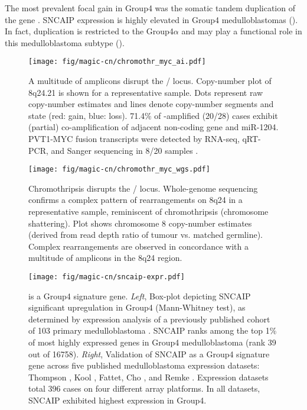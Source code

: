 The most prevalent focal gain in Group4 was the somatic tandem duplication of the  gene . SNCAIP expression is highly elevated in Group4 medulloblastomas (). In fact,  duplication is restricted to the Group4$\alpha$ and may play a functional role in this medulloblastoma subtype ().

\begin{figure}[t]
	\begin{center}
		\texttt{[image: fig/magic-cn/chromothr\_myc\_ai.pdf]}
	\end{center}
	\caption[A multitude of amplicons disrupt the / locus]
	{
	A multitude of amplicons disrupt the / locus.
	Copy-number plot of 8q24.21 is shown for a representative sample. Dots represent raw copy-number estimates and lines denote copy-number segments and state (red: gain, blue: loss). 71.4\% of -amplified (20/28) cases exhibit (partial) co-amplification of adjacent non-coding  gene and miR-1204. PVT1-MYC fusion transcripts were detected by RNA-seq, qRT-PCR, and Sanger sequencing in 8/20 samples .
	}
	\label{fig:chromothr_myc}
\end{figure}

\begin{figure}[b]
	\begin{center}
		\texttt{[image: fig/magic-cn/chromothr\_myc\_wgs.pdf]}
	\end{center}
	\caption[Chromothripsis disrupts the / locus.]
	{
	Chromothripsis disrupts the / locus.
	Whole-genome sequencing confirms a complex pattern of rearrangements on 8q24 in a representative sample, reminiscent of chromothripsis (chromosome shattering).
	Plot shows chromosome 8 copy-number estimates (derived from read depth ratio of tumour vs. matched germline).
	Complex rearrangements are observed in concordance with a multitude of amplicons in the 8q24 region.
	}
	\label{fig:chromothr_myc_wgs}
\end{figure}

\begin{figure}[t]
	\begin{center}
		\texttt{[image: fig/magic-cn/sncaip-expr.pdf]}
	\end{center}
	\caption[ is a Group4 signature gene]
	{
	 is a Group4 signature gene.
	\emph{Left}, Box-plot depicting SNCAIP significant upregulation in Group4 (Mann-Whitney test), as determined by expression analysis of a previously published cohort of 103 primary medulloblastoma . SNCAIP ranks among the top 1\% of most highly expressed genes in Group4 medulloblastoma (rank 39 out of 16758).
	\emph{Right}, Validation of SNCAIP as a Group4 signature gene across five published medulloblastoma expression datasets: Thompson , Kool , Fattet, Cho , and Remke . Expression datasets total 396 cases on four different array platforms. In all datasets, SNCAIP exhibited highest expression in Group4.
	}
	\label{fig:sncaip-expr}
\end{figure}

